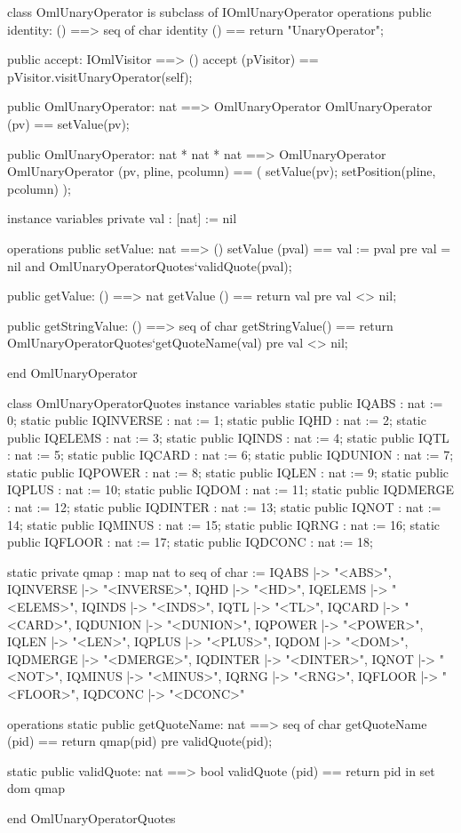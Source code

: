 \begin{vdm_al}
class OmlUnaryOperator is subclass of IOmlUnaryOperator
operations
  public identity: () ==> seq of char
  identity () == return "UnaryOperator";

  public accept: IOmlVisitor ==> ()
  accept (pVisitor) == pVisitor.visitUnaryOperator(self);

  public OmlUnaryOperator: nat ==> OmlUnaryOperator
  OmlUnaryOperator (pv) == setValue(pv);

  public OmlUnaryOperator: nat * nat * nat ==> OmlUnaryOperator
  OmlUnaryOperator (pv, pline, pcolumn) == ( setValue(pv); setPosition(pline, pcolumn) );

instance variables
  private val : [nat] := nil

operations
  public setValue: nat ==> ()
  setValue (pval) == val := pval
    pre val = nil and OmlUnaryOperatorQuotes`validQuote(pval);

  public getValue: () ==> nat
  getValue () == return val
    pre val <> nil;

  public getStringValue: () ==> seq of char
  getStringValue() == return OmlUnaryOperatorQuotes`getQuoteName(val)
    pre val <> nil;

end OmlUnaryOperator
\end{vdm_al}
\begin{vdm_al}
class OmlUnaryOperatorQuotes
instance variables
  static public IQABS : nat := 0;
  static public IQINVERSE : nat := 1;
  static public IQHD : nat := 2;
  static public IQELEMS : nat := 3;
  static public IQINDS : nat := 4;
  static public IQTL : nat := 5;
  static public IQCARD : nat := 6;
  static public IQDUNION : nat := 7;
  static public IQPOWER : nat := 8;
  static public IQLEN : nat := 9;
  static public IQPLUS : nat := 10;
  static public IQDOM : nat := 11;
  static public IQDMERGE : nat := 12;
  static public IQDINTER : nat := 13;
  static public IQNOT : nat := 14;
  static public IQMINUS : nat := 15;
  static public IQRNG : nat := 16;
  static public IQFLOOR : nat := 17;
  static public IQDCONC : nat := 18;

  static private qmap : map nat to seq of char :=
    { IQABS |-> "<ABS>",
      IQINVERSE |-> "<INVERSE>",
      IQHD |-> "<HD>",
      IQELEMS |-> "<ELEMS>",
      IQINDS |-> "<INDS>",
      IQTL |-> "<TL>",
      IQCARD |-> "<CARD>",
      IQDUNION |-> "<DUNION>",
      IQPOWER |-> "<POWER>",
      IQLEN |-> "<LEN>",
      IQPLUS |-> "<PLUS>",
      IQDOM |-> "<DOM>",
      IQDMERGE |-> "<DMERGE>",
      IQDINTER |-> "<DINTER>",
      IQNOT |-> "<NOT>",
      IQMINUS |-> "<MINUS>",
      IQRNG |-> "<RNG>",
      IQFLOOR |-> "<FLOOR>",
      IQDCONC |-> "<DCONC>" }

operations
  static public getQuoteName: nat ==> seq of char
  getQuoteName (pid) ==
    return qmap(pid)
    pre validQuote(pid);

  static public validQuote: nat ==> bool
  validQuote (pid) == return pid in set dom qmap

end OmlUnaryOperatorQuotes
\end{vdm_al}
